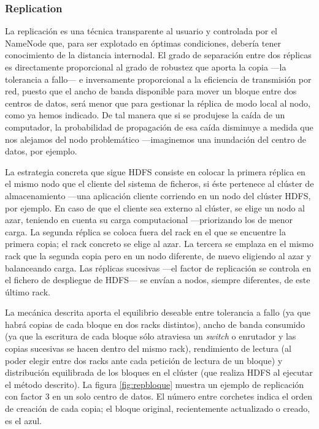 \subsubsection{Replication}\label{subsubsec:replicacionbloques}
\noindent La replicaci\'on es una t\'ecnica transparente al usuario y controlada por el NameNode que, para ser explotado en \'optimas condiciones, deber\'ia tener conocimiento de la distancia internodal. El grado de separaci\'on entre dos r\'eplicas es directamente proporcional al grado de robustez que aporta la copia ---la tolerancia a fallo--- e inversamente proporcional a la eficiencia de transmisi\'on por red, puesto que el ancho de banda disponible para mover un bloque entre dos centros de datos, ser\'a menor que para gestionar la r\'eplica de modo local al nodo, como ya hemos indicado. De tal manera que si se produjese la ca\'ida de un computador, la probabilidad de propagaci\'on de esa ca\'ida disminuye a medida que nos alejamos del nodo problem\'atico ---imaginemos una inundaci\'on del centro de datos, por ejemplo.\newline

La estrategia concreta que sigue HDFS consiste en colocar la primera r\'eplica en el mismo nodo que el cliente del sistema de ficheros, si \'este pertenece al cl\'uster de almacenamiento ---una aplicaci\'on cliente corriendo en un nodo del cl\'uster HDFS, por ejemplo. En caso de que el cliente sea externo al cl\'uster, se elige un nodo al azar, teniendo en cuenta su carga computacional ---prio\-ri\-zan\-do los de menor carga. La segunda r\'eplica se coloca fuera del rack en el que se encuentre la primera copia; el rack concreto se elige al azar. La tercera se emplaza en el mismo rack que la segunda copia pero en un nodo diferente, de nuevo eligiendo al azar y balanceando carga. Las r\'eplicas sucesivas ---el factor de replicaci\'on se controla en el fichero de despliegue de HDFS--- se env\'ian a nodos, siempre diferentes, de este \'ultimo rack.\newline

La mec\'anica descrita aporta el equilibrio deseable entre tolerancia a fallo (ya que habr\'a copias de cada bloque en dos racks distintos), ancho de banda consumido (ya que la escritura de cada bloque s\'olo atraviesa un \emph{switch} o enrutador y las copias sucesivas se hacen dentro del mismo rack), rendimiento de lectura (al poder elegir entre dos racks ante cada petici\'on de lectura de un bloque) y distribuci\'on equilibrada de los bloques en el cl\'uster (que realiza HDFS al ejecutar el m\'etodo descrito). La figura \ref{fig:repbloque} muestra un ejemplo de replicaci\'on con factor 3 en un solo centro de datos. El n\'umero entre corchetes indica el orden de creaci\'on de cada copia; el bloque original, recientemente actualizado o creado, es el azul.

